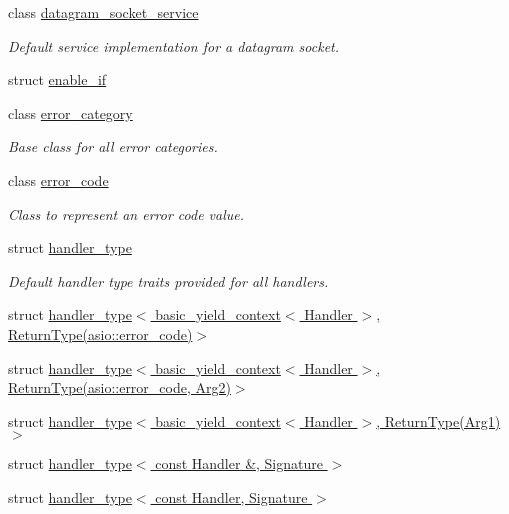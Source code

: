 \begin{DoxyCompactItemize}
class \hyperlink{classasio_1_1datagram__socket__service}{datagram\+\_\+socket\+\_\+service}
\begin{DoxyCompactList}\small\item\em Default service implementation for a datagram socket. \end{DoxyCompactList}\item 
struct \hyperlink{structasio_1_1enable__if}{enable\+\_\+if}
\item 
class \hyperlink{classasio_1_1error__category}{error\+\_\+category}
\begin{DoxyCompactList}\small\item\em Base class for all error categories. \end{DoxyCompactList}\item 
class \hyperlink{classasio_1_1error__code}{error\+\_\+code}
\begin{DoxyCompactList}\small\item\em Class to represent an error code value. \end{DoxyCompactList}\item 
struct \hyperlink{structasio_1_1handler__type}{handler\+\_\+type}
\begin{DoxyCompactList}\small\item\em Default handler type traits provided for all handlers. \end{DoxyCompactList}\item 
struct \hyperlink{structasio_1_1handler__type_3_01basic__yield__context_3_01_handler_01_4_00_01_01_01_01_01_01_01_4293f21a96d71a94577a209dcb83a1de}{handler\+\_\+type$<$ basic\+\_\+yield\+\_\+context$<$ Handler $>$,           Return\+Type(asio\+::error\+\_\+code)$>$}
\item 
struct \hyperlink{structasio_1_1handler__type_3_01basic__yield__context_3_01_handler_01_4_00_01_01_01_01_01_01_01_d15b502de1534464d7abfd193f1b4967}{handler\+\_\+type$<$ basic\+\_\+yield\+\_\+context$<$ Handler $>$,           Return\+Type(asio\+::error\+\_\+code, Arg2)$>$}
\item 
struct \hyperlink{structasio_1_1handler__type_3_01basic__yield__context_3_01_handler_01_4_00_01_return_type_07_arg1_08_4}{handler\+\_\+type$<$ basic\+\_\+yield\+\_\+context$<$ Handler $>$, Return\+Type(\+Arg1)$>$}
\item 
struct \hyperlink{structasio_1_1handler__type_3_01const_01_handler_01_6_00_01_signature_01_4}{handler\+\_\+type$<$ const Handler \&, Signature $>$}
\item 
struct \hyperlink{structasio_1_1handler__type_3_01const_01_handler_00_01_signature_01_4}{handler\+\_\+type$<$ const Handler, Signature $>$}

\end{DoxyCompactItemize}
